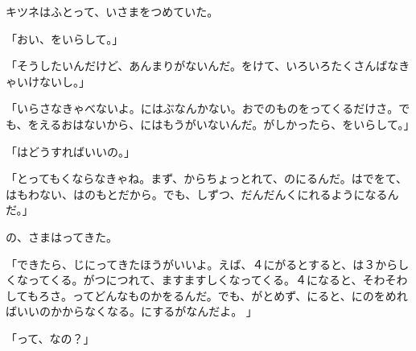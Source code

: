 キツネはふとって、いさまをつめていた。

「おい、をいらして。」

「そうしたいんだけど、あんまりがないんだ。をけて、いろいろたくさんばなきゃいけないし。」

「いらさなきゃべないよ。にはぶなんかない。おでのものをってくるだけさ。でも、をえるおはないから、にはもうがいないんだ。がしかったら、をいらして。」

「はどうすればいいの。」

「とってもくならなきゃね。まず、からちょっとれて、のにるんだ。はでをて、はもわない、はのもとだから。でも、しずつ、だんだんくにれるようになるんだ。」

の、さまはってきた。

「できたら、じにってきたほうがいいよ。えば、４にがるとすると、は３からしくなってくる。がつにつれて、ますますしくなってくる。４になると、そわそわしてもろさ。ってどんなものかをるんだ。でも、がとめず、にると、にのをめればいいのかからなくなる。にするがなんだよ。 」

「って、なの？」


